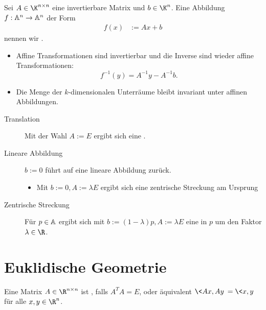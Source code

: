 \begin{df}
	Sei $A \in \K^{n\times n}$ eine invertierbare Matrix und $b \in \K^n$.
	Eine Abbildung $f: \mathbb{A}^n \to \mathbb{A}^n$ der Form
	\begin{align*}
		f(x) &:= Ax + b
	\end{align*}
	nennen wir .
	\begin{note}
		\begin{itemize}
			\item
				Affine Transformationen sind invertierbar und die Inverse sind wieder affine Transformationen:
				\[
					f^{-1}(y) = A^{-1} y  - A^{-1} b.
				\]
			\item
				Die Menge der $k$-dimensionalen Unterräume bleibt invariant unter affinen Abbildungen.
		\end{itemize}
	\end{note}
\end{df}

\begin{ex}
	\begin{description}
		\item[Translation]
			Mit der Wahl $A := E$ ergibt sich eine .
		\item[Lineare Abbildung]
			$b := 0$ führt auf eine lineare Abbildung zurück.
			\begin{itemize}
				\item
					Mit $b := 0, A := \lambda E$ ergibt sich eine zentrische Streckung am Ursprung
			\end{itemize}
		\item[Zentrische Streckung]
			Für $p \in \mathbb{A}$ ergibt sich mit $b := (1 - \lambda) p, A := \lambda E$ eine  in $p$ um den Faktor $\lambda \in \R$.
	\end{description}
\end{ex}


\section{Euklidische Geometrie}

\begin{df}
	Eine Matrix $A \in \R^{n\times n}$ ist , falls $A^T A = E$, oder äquivalent $\<Ax, Ay\> = \<x, y\>$ für alle $x, y \in \R^n$.
\end{df}

